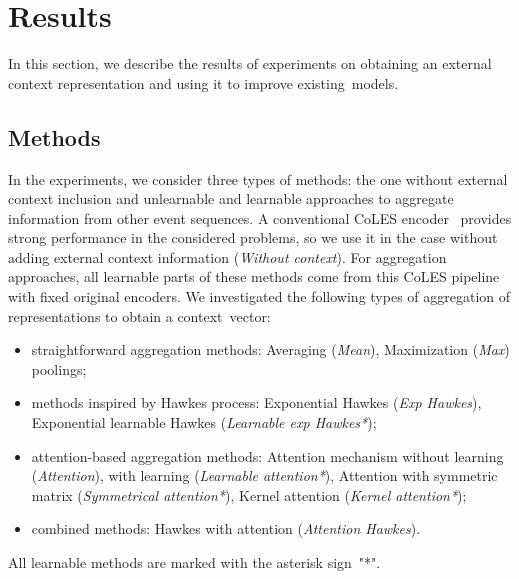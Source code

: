 


\section{Results}\label{sec:results}

In this section, we describe the results of experiments on obtaining an external context representation and using it to improve existing~models.

\subsection{Methods}

In the experiments, we consider three types of methods: the one without external context inclusion and unlearnable and learnable approaches to aggregate information from other event sequences.
A conventional CoLES encoder~\cite{babaev2022coles} provides strong performance in the considered problems, so we use it in the case without adding external context information (\emph{Without context}).
For aggregation approaches, all learnable parts of these methods come from this CoLES pipeline with fixed original encoders. 
We investigated the following types of aggregation of representations to obtain a context~vector:
\begin{itemize}
    \item straightforward aggregation methods: Averaging (\emph{Mean}), Maximization (\emph{Max}) poolings;
    \item methods inspired by Hawkes process: Exponential Hawkes (\emph{Exp Hawkes}), Exponential learnable Hawkes (\emph{Learnable exp Hawkes*});
    \item attention-based aggregation methods: Attention mechanism without learning (\emph{Attention}), with learning (\emph{Learnable attention*}), Attention with symmetric matrix (\emph{Symmetrical attention*}), Kernel attention (\emph{Kernel attention*});
    \item combined methods: Hawkes with attention (\emph{Attention Hawkes}).
\end{itemize}
All learnable methods are marked with the asterisk sign~"*".




